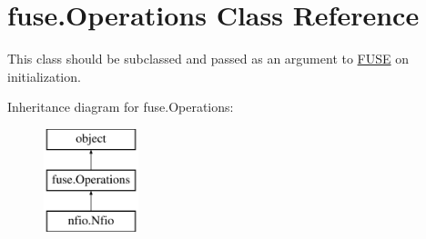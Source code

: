 \hypertarget{classfuse_1_1Operations}{\section{fuse.\-Operations Class Reference}
\label{classfuse_1_1Operations}
}


This class should be subclassed and passed as an argument to \hyperlink{classfuse_1_1FUSE}{F\-U\-S\-E} on initialization.  


Inheritance diagram for fuse.\-Operations\-:\begin{figure}[H]
\begin{center}
\leavevmode
\includegraphics[height=3.000000cm]{classfuse_1_1Operations}
\end{center}
\end{figure}
